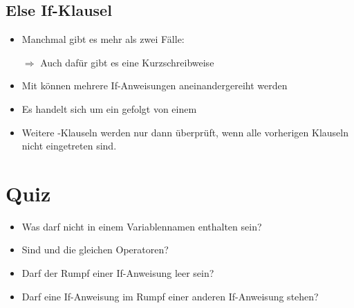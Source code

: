 \livecoding

\subsection{Else If-Klausel}

\begin{frame}
    \slidehead
    \begin{itemize}
        \item Manchmal gibt es mehr als zwei Fälle:
        \item[$\Rightarrow$] Auch dafür gibt es eine Kurzschreibweise
    \end{itemize}
\end{frame}

\begin{frame}
    \slidehead

    \begin{itemize}
        \item Mit  können mehrere If-Anweisungen aneinandergereiht werden
        \item Es handelt sich um ein  gefolgt von einem 
        \item Weitere -Klauseln werden nur dann überprüft, wenn alle vorherigen Klauseln nicht eingetreten sind.
    \end{itemize}
\end{frame}

\livecoding


\section{Quiz}
\begin{frame}[fragile]
    \slidehead
    \begin{itemize}[<+->]
        \item Was darf nicht in einem Variablennamen enthalten sein?
        \item Sind \pythoninline{=} und \pythoninline{==} die gleichen Operatoren?
        \item Darf der Rumpf einer If-Anweisung leer sein?
        \item Darf eine If-Anweisung im Rumpf einer anderen If-Anweisung stehen?
    \end{itemize}
\end{frame}


